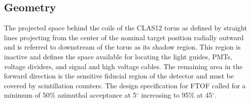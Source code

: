 \documentclass{elsart}
\begin{document}
\subsection{Geometry}
\label{ftof-geometry}

The projected space behind the coils of the CLAS12 torus as defined by straight lines projecting from
the center of the nominal target position radially outward and is referred to downstream of the torus as
its shadow region. This region is inactive and defines the space available for locating the light guides,
PMTs, voltage dividers, and signal and high voltage cables. The remaining area in the forward direction is
the sensitive fiducial region of the detector and must be covered by scintillation counters. The design
specification for FTOF called for a minimum of 50\% azimuthal acceptance at 5$^\circ$ increasing to
95\% at 45$^\circ$.
\end{document}
